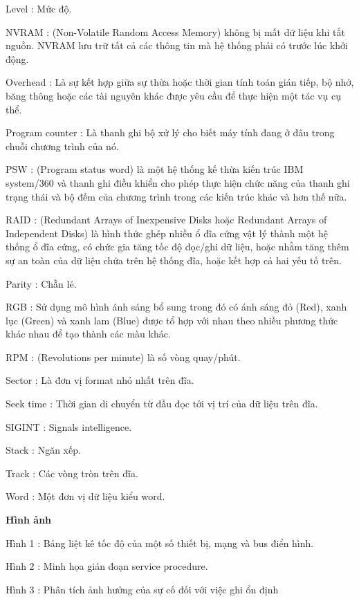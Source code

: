 \documentclass{report}
\begin{document}
\smallskip
Level : Mức độ.

\smallskip
NVRAM : (Non-Volatile Random Access Memory) không bị mất dữ liệu khi tắt nguồn. NVRAM lưu trữ tất cả các thông tin mà hệ thống phải có trước lúc khởi động.

\smallskip
Overhead : Là sự kết hợp giữa sự thừa hoặc thời gian tính toán gián tiếp, bộ nhớ, băng thông hoặc các tài nguyên khác được yêu cầu để thực hiện một tác vụ cụ thể.

\smallskip
Program counter : Là thanh ghi bộ xử lý cho biết máy tính đang ở đâu trong chuỗi chương trình của nó.

\smallskip
PSW : (Program status word) là một hệ thống kế thừa kiến trúc IBM system/360 và thanh ghi điều khiển cho phép thực hiện chức năng của thanh ghi trạng thái và bộ đếm của chương trình trong các kiến trúc khác và hơn thế nữa.

\smallskip
RAID : (Redundant Arrays of Inexpensive Disks hoặc Redundant Arrays of Independent Disks) là hình thức ghép nhiều ổ đĩa cứng vật lý thành một hệ thống ổ đĩa cứng, có chức gia tăng tốc độ đọc/ghi dữ liệu, hoặc nhằm tăng thêm sự an toàn của dữ liệu chứa trên hệ thống đĩa, hoặc kết hợp cả hai yếu tố trên.

\smallskip
Parity : Chẵn lẻ.

\smallskip
RGB : Sử dụng mô hình ánh sáng bổ sung trong đó có ánh sáng đỏ (Red), xanh lục (Green) và xanh lam (Blue) được tổ hợp với nhau theo nhiều phương thức khác nhau để tạo thành các màu khác.

\smallskip
RPM : (Revolutions per minute) là số vòng quay/phút.

\smallskip
Sector : Là đơn vị format nhỏ nhất trên đĩa. 

\smallskip
Seek time : Thời gian di chuyển từ đầu đọc tới vị trí của dữ liệu trên đĩa.

\smallskip
SIGINT : Signals intelligence.

\smallskip
Stack : Ngăn xếp.

\smallskip
Track : Các vòng tròn trên đĩa.

\smallskip
Word : Một đơn vị dữ liệu kiểu word.

\changefontsizes{14pt}
\bigskip
\textbf{Hình ảnh}

\bigskip
\changefontsizes{13pt}
Hình 1 : Bảng liệt kê tốc độ của một số thiết bị, mạng và bus điển hình.

Hình 2 : Minh họa gián đoạn service procedure.

Hình 3 : Phân tích ảnh hưởng của sự cố đối với việc ghi ổn định
\end{document}
